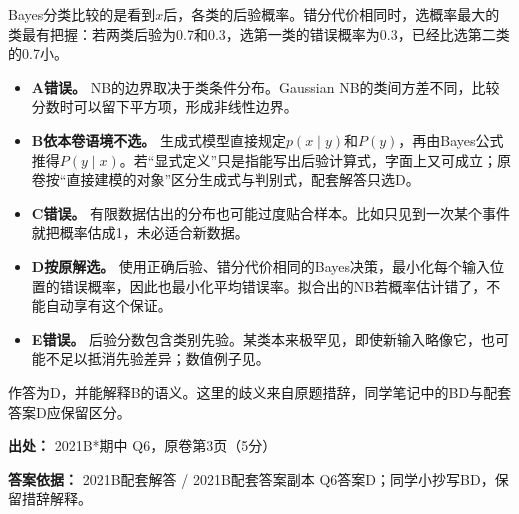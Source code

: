 Bayes分类比较的是看到\(x\)后，各类的后验概率。错分代价相同时，选概率最大的类最有把握：若两类后验为0.7和0.3，选第一类的错误概率为0.3，已经比选第二类的0.7小。



\begin{itemize}

\item \textbf{A错误。} NB的边界取决于类条件分布。Gaussian NB的类间方差不同，比较分数时可以留下平方项，形成非线性边界。

\item \textbf{B依本卷语境不选。} 生成式模型直接规定\(p(x\mid y)\)和\(P(y)\)，再由Bayes公式推得\(P(y\mid x)\)。若“显式定义”只是指能写出后验计算式，字面上又可成立；原卷按“直接建模的对象”区分生成式与判别式，配套解答只选D。

\item \textbf{C错误。} 有限数据估出的分布也可能过度贴合样本。比如只见到一次某个事件就把概率估成1，未必适合新数据。

\item \textbf{D按原解选。} 使用正确后验、错分代价相同的Bayes决策，最小化每个输入位置的错误概率，因此也最小化平均错误率。拟合出的NB若概率估计错了，不能自动享有这个保证。

\item \textbf{E错误。} 后验分数包含类别先验。某类本来极罕见，即使新输入略像它，也可能不足以抵消先验差异；数值例子见。

\end{itemize}


作答为D，并能解释B的语义。这里的歧义来自原题措辞，同学笔记中的BD与配套答案D应保留区分。


\textbf{出处：} 2021B*期中 Q6，原卷第3页（5分）


\textbf{答案依据：} 2021B配套解答 / 2021B配套答案副本 Q6答案D；同学小抄写BD，保留措辞解释。
